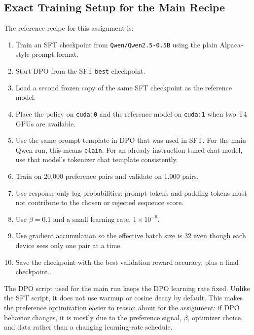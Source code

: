 \documentclass[11pt]{article}
\newcommand{\modelname}{\texttt{Qwen/Qwen2.5-0.5B}}
\begin{document}
\subsection{Exact Training Setup for the Main Recipe}
The reference recipe for this assignment is:
\begin{enumerate}[leftmargin=*]
  \item Train an SFT checkpoint from \modelname{} using the plain Alpaca-style prompt format.
  \item Start DPO from the SFT \texttt{best} checkpoint.
  \item Load a second frozen copy of the same SFT checkpoint as the reference model.
  \item Place the policy on \texttt{cuda:0} and the reference model on \texttt{cuda:1} when two T4 GPUs are available.
  \item Use the same prompt template in DPO that was used in SFT. For the main Qwen run, this means \texttt{plain}. For an already instruction-tuned chat model, use that model's tokenizer chat template consistently.
  \item Train on 20,000 preference pairs and validate on 1,000 pairs.
  \item Use response-only log probabilities: prompt tokens and padding tokens must not contribute to the chosen or rejected sequence score.
  \item Use $\beta=0.1$ and a small learning rate, $1\times 10^{-6}$.
  \item Use gradient accumulation so the effective batch size is 32 even though each device sees only one pair at a time.
  \item Save the checkpoint with the best validation reward accuracy, plus a final checkpoint.
\end{enumerate}

The DPO script used for the main run keeps the DPO learning rate fixed. Unlike the SFT script, it does not use warmup or cosine decay by default. This makes the preference optimization easier to reason about for the assignment: if DPO behavior changes, it is mostly due to the preference signal, $\beta$, optimizer choice, and data rather than a changing learning-rate schedule.
\end{document}
